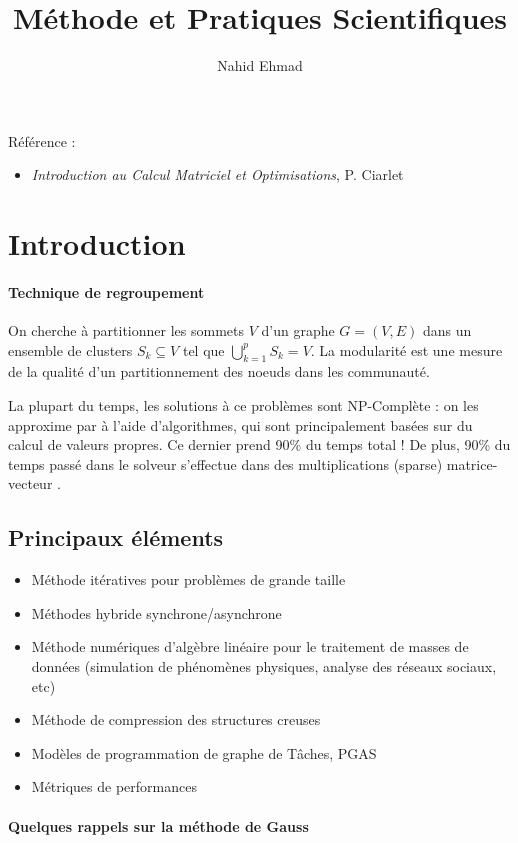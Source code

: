 \documentclass{article}
\title{Méthode et Pratiques Scientifiques}
\author{Nahid Ehmad}
\date{}
\begin{document}
\maketitle
\tableofcontents
\newpage

Référence : 
\begin{itemize}
\item \textit{Introduction au Calcul Matriciel et Optimisations}, P. Ciarlet 
\end{itemize}

\section{Introduction}
\paragraph{Technique de regroupement}
On cherche à partitionner les sommets $V$ d'un graphe $G=(V,E)$ dans un ensemble de clusters $S_k\subseteq V$ tel que $\bigcup_{k=1}^{p}S_k = V$. La modularité est une mesure de la qualité d'un partitionnement des noeuds dans les communauté. 
\bigskip

La plupart du temps, les solutions à ce problèmes sont NP-Complète : on les approxime par à l'aide d'algorithmes, qui sont principalement basées sur du calcul de valeurs propres. Ce dernier prend 90\% du temps total ! De plus, 90\% du temps passé dans le solveur s'effectue dans des multiplications (sparse) matrice-vecteur .

\subsection{Principaux éléments}
\begin{itemize}
\item Méthode itératives pour problèmes de grande taille
\item Méthodes hybride synchrone/asynchrone
\item Méthode numériques d'algèbre linéaire pour le traitement de masses de données (simulation de phénomènes physiques, analyse des réseaux sociaux, etc)
\item Méthode de compression des structures creuses
\item Modèles de programmation de graphe de Tâches, PGAS
\item Métriques de performances
\end{itemize}

\paragraph{Quelques rappels sur la méthode de Gauss}
\end{document}
